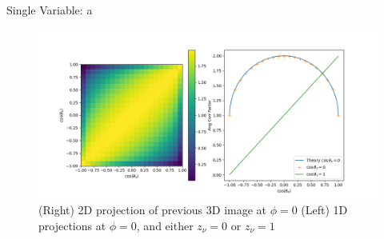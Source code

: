 \documentclass{beamer}
\begin{document}
\begin{frame}{Single Variable: a}
	\begin{figure}
		\centering
		\includegraphics[width=0.8\paperwidth]{plots/crosssections_a.png}
		\caption{(Right) 2D projection of previous 3D image at $\phi = 0$ (Left) 1D projections at $\phi=0$, and either $z_\nu = 0$ or $z_\nu = 1$}
	\end{figure}
\end{frame}
\end{document}

